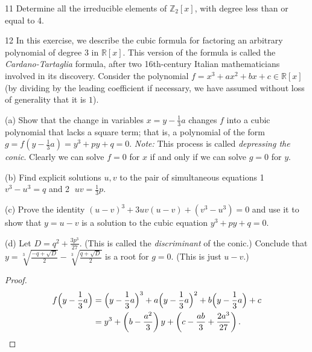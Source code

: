 \begin{problem}{11}
    Determine all the irreducible elements of $\mathbb{Z}_2[x]$, with degree less than or
    equal to 4.
\end{problem}
\unsolved

\begin{problem}{12}
    In this exercise, we describe the cubic formula for factoring an arbitrary polynomial
    of degree $3$ in $\mathbb{R}[x]$. This version of the formula is called the 
    \emph{Cardano-Tartaglia} formula, after two 16th-century Italian mathematicians 
    involved in its discovery. Consider the polynomial $f = x^3 + ax^2 + bx + c \in \mathbb{R}[x]$
    (by dividing by the leading coefficient if necessary, we have assumed without loss 
    of generality that it is $1$).

    (a) Show that the change in variables $x = y - \frac{1}{3}a$ changes $f$ into 
        a cubic polynomial that lacks a square term; that is, a 
        polynomial of the form $g = f(y - \frac{1}{3}a) = y^3 + py + q = 0$.
        \emph{Note: } This process is called \emph{depressing the conic}. Clearly 
        we can solve $f = 0$ for $x$ if and only if we can solve $g = 0$ for $y$.

    (b) Find explicit solutions $u, v$ to the pair of simultaneous equations 
        \textcircled{1} $v^3 - u^3 = q$ and \textcircled{2} $uv = \frac{1}{3}p$.

    (c) Prove the identity $(u - v)^3 + 3uv(u - v) + (v^3 - u^3) = 0$ and 
        use it to show that $y = u - v$ is a solution to the cubic equation 
        $y^3 + py + q = 0$.

    (d) Let $D = q^2 + \frac{3p^3}{27}$. (This is called the \emph{discriminant} of the conic.)
        Conclude that $y = \sqrt[3]{\frac{-q + \sqrt{D}}{2}} - \sqrt[3]{\frac{q + \sqrt{D}}{2}}$
        is a root for $g = 0$. (This is just $u - v$.)
\end{problem}
\solved


\begin{proof}
\begin{align*}
    f\Bigl(y - \frac{1}{3}a\Bigr) &= \Bigl(y - \frac{1}{3}a\Bigr)^3 + a\Bigl(y - \frac{1}{3}a\Bigr)^2 + b\Bigl(y - \frac{1}{3}a\Bigr) + c \\
                                  &= y^3 + \left(b - \frac{a^2}{3}\right)y + \left(c - \frac{ab}{3} + \frac{2a^3}{27}\right).
\end{align*}
\end{proof}

